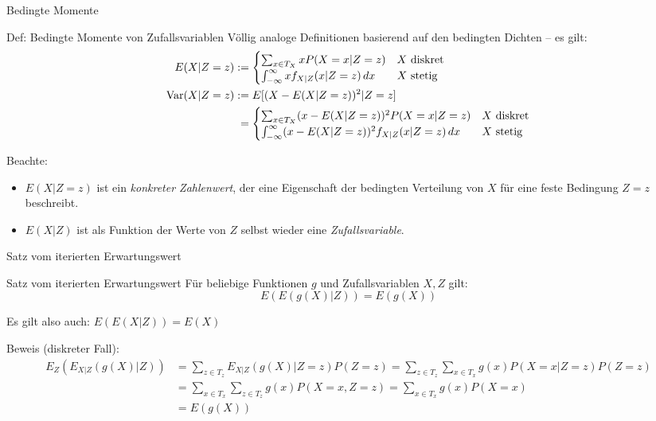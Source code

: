 \documentclass[
  10pt,
  ignorenonframetext,
]{beamer}
\providecommand{\tightlist}{%
  \setlength{\itemsep}{0pt}\setlength{\parskip}{0pt}}
\begin{document}
\begin{frame}{Bedingte Momente}
\label{bedingte-momente-1}
\begin{block}{Def: Bedingte Momente von Zufallsvariablen}
\label{def-bedingte-momente-von-zufallsvariablen}
Völlig analoge Definitionen basierend auf den bedingten Dichten -- es
gilt: \begin{align*}
E(X|Z = z) &:= \begin{cases} 
             \sum_{x \in T_X} x P(X = x|Z = z) & X \text{ diskret} \\
              \int_{-\infty}^\infty x f_{X|Z}(x|Z = z) \,dx & X \text{ stetig}
            \end{cases}\\
\operatorname{Var}(X|Z = z) &:= E[(X -E(X|Z = z))^2|Z = z] \\
        &\phantom{:}= \begin{cases} 
             \sum_{x \in T_X} (x - E(X|Z = z))^2 P(X = x|Z = z)  & X \text{ diskret} \\
              \int_{-\infty}^\infty (x - E(X |Z = z))^2 f_{X|Z}(x|Z = z) \,dx & X \text{ stetig}
            \end{cases}
\end{align*}
\end{block}

Beachte:

\begin{itemize}
\tightlist
\item
  \(E(X|Z = z)\) ist ein \emph{konkreter Zahlenwert}, der eine
  Eigenschaft der bedingten Verteilung von \(X\) für eine feste
  Bedingung \(Z = z\) beschreibt.\\
\item
  \(E(X|Z)\) ist als Funktion der Werte von \(Z\) selbst wieder eine
  \emph{Zufallsvariable}.
\end{itemize}
\end{frame}

\begin{frame}{Satz vom iterierten Erwartungswert}
\label{satz-vom-iterierten-erwartungswert}
\begin{block}{Satz vom iterierten Erwartungswert}
\label{satz-vom-iterierten-erwartungswert-1}
Für beliebige Funktionen \(g\) und Zufallsvariablen \(X, Z\) gilt:
\[E(E(g(X)|Z)) = E(g(X))\]
\end{block}

Es gilt also auch: \(E(E(X|Z)) = E(X)\)

Beweis (diskreter Fall): \begin{align*}
E_Z(E_{X|Z}(g(X)|Z)) &= \sum_{z \in T_z} E_{X|Z}(g(X)|Z = z) P(Z = z) =  \sum_{z \in T_z} \sum_{x \in T_x} g(x) P(X = x|Z = z) P(Z = z) \\
              &= \sum_{x \in T_x} \sum_{z \in T_z} g(x) P(X = x, Z = z) = \sum_{x \in T_x} g(x) P(X = x)\\
              &= E(g(X))
\end{align*}
\end{frame}
\end{document}
